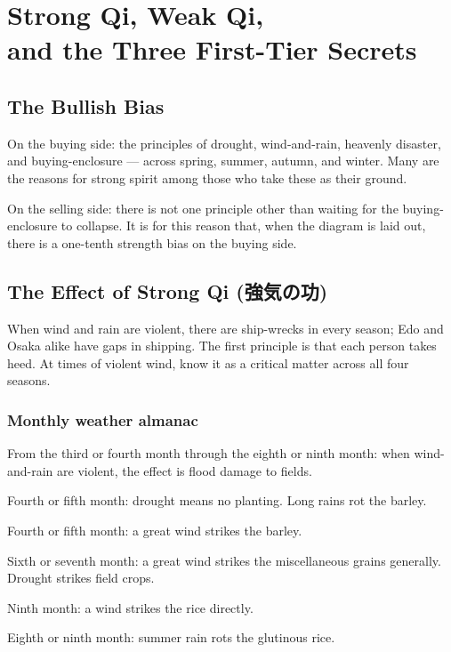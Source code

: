 \documentclass[10pt, openany]{book}
\newcommand{\jp}[1]{{\japanesefont #1}}
\begin{document}
\chapter{Strong Qi, Weak Qi,\\ and the Three First-Tier Secrets}

\section{The Bullish Bias}

On the buying side: the principles of drought, wind-and-rain,
heavenly disaster, and buying-enclosure --- across spring, summer,
autumn, and winter. Many are the reasons for strong spirit among
those who take these as their ground.

On the selling side: there is not one principle other than waiting
for the buying-enclosure to collapse. It is for this reason that,
when the diagram is laid out, there is a one-tenth strength bias
on the buying side.

\section{The Effect of Strong Qi (\jp{強気の功})}

When wind and rain are violent, there are ship-wrecks in every
season; Edo and Osaka alike have gaps in shipping. The first
principle is that each person takes heed. At times of violent
wind, know it as a critical matter across all four seasons.

\subsection*{Monthly weather almanac}

From the third or fourth month through the eighth or ninth month:
when wind-and-rain are violent, the effect is flood damage to
fields.

Fourth or fifth month: drought means no planting. Long rains rot
the barley.

Fourth or fifth month: a great wind strikes the barley.

Sixth or seventh month: a great wind strikes the miscellaneous
grains generally. Drought strikes field crops.

Ninth month: a wind strikes the rice directly.

Eighth or ninth month: summer rain rots the glutinous rice.
\end{document}
